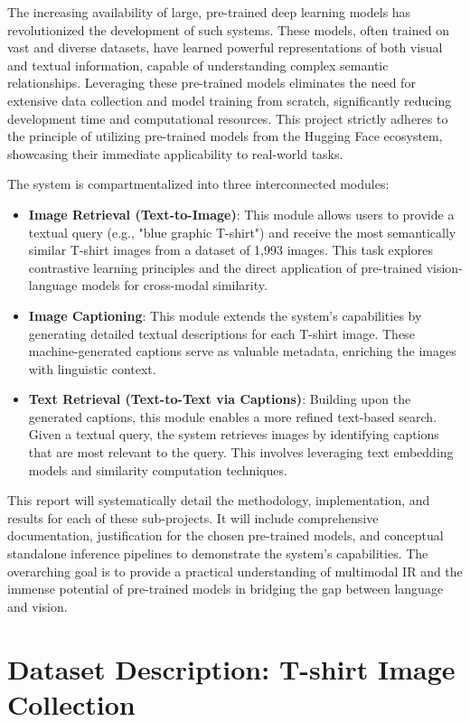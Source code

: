 \documentclass{article}
\begin{document}
The increasing availability of large, pre-trained deep learning models has revolutionized the development of such systems. These models, often trained on vast and diverse datasets, have learned powerful representations of both visual and textual information, capable of understanding complex semantic relationships. Leveraging these pre-trained models eliminates the need for extensive data collection and model training from scratch, significantly reducing development time and computational resources. This project strictly adheres to the principle of utilizing pre-trained models from the Hugging Face ecosystem, showcasing their immediate applicability to real-world tasks.

The system is compartmentalized into three interconnected modules:
\begin{itemize}
    \item \textbf{Image Retrieval (Text-to-Image)}: This module allows users to provide a textual query (e.g., "blue graphic T-shirt") and receive the most semantically similar T-shirt images from a dataset of 1,993 images. This task explores contrastive learning principles and the direct application of pre-trained vision-language models for cross-modal similarity.
    \item \textbf{Image Captioning}: This module extends the system's capabilities by generating detailed textual descriptions for each T-shirt image. These machine-generated captions serve as valuable metadata, enriching the images with linguistic context.
    \item \textbf{Text Retrieval (Text-to-Text via Captions)}: Building upon the generated captions, this module enables a more refined text-based search. Given a textual query, the system retrieves images by identifying captions that are most relevant to the query. This involves leveraging text embedding models and similarity computation techniques.
\end{itemize}
This report will systematically detail the methodology, implementation, and results for each of these sub-projects. It will include comprehensive documentation, justification for the chosen pre-trained models, and conceptual standalone inference pipelines to demonstrate the system's capabilities. The overarching goal is to provide a practical understanding of multimodal IR and the immense potential of pre-trained models in bridging the gap between language and vision.

\section{Dataset Description: T-shirt Image Collection}
\label{sec:dataset}
\end{document}
